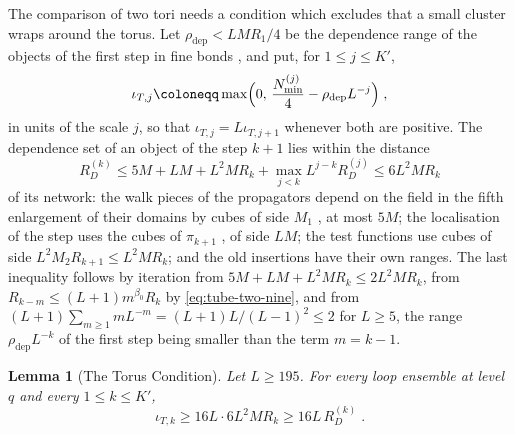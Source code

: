 \documentclass[11pt]{preprint}
\numberwithin{equation}{section}
\newtheorem{lemma}[theorem]{Lemma}
\theoremstyle{definition}
\theoremstyle{remark}
\theoremstyle{plain}
\begin{document}
The comparison of two tori needs a condition which excludes that a small cluster wraps around the torus. Let $\rho_{\mathrm{dep}} < LMR_1/4$ be the dependence range of the objects of the first step in fine bonds \cite[Sections~E.9.2 and~E.10.4]{WilsonFirstStep}, and put, for $1 \leq j \leq K'$,
\begin{equation}\label{eq:torus-margin}
    \iota_{T,j} \coloneqq \max\Bigl(0,\, \frac{N^{(j)}_{\min}}{4} - \rho_{\mathrm{dep}}L^{-j}\Bigr)\;,
\end{equation}
in units of the scale $j$, so that $\iota_{T,j} = L\iota_{T,j+1}$ whenever both are positive. The dependence set of an object of the step $k + 1$ lies within the distance
\begin{equation}\label{eq:dependence-range}
    R^{(k)}_D \leq 5M + LM + L^2MR_k + \max_{j<k}L^{j-k}R^{(j)}_D \leq 6L^2MR_k
\end{equation}
of its network: the walk pieces of the propagators depend on the field in the fifth enlargement of their domains by cubes of side $M_1$ \cite[Theorem~3.10, p.~416]{BalabanPBG}, at most $5M$; the localisation of the step uses the cubes of $\pi_{k+1}$ \cite[p.~13]{BalabanRG2}, of side $LM$; the test functions use cubes of side $L^2M_2R_{k+1} \leq L^2MR_k$; and the old insertions have their own ranges. The last inequality follows by iteration from $5M + LM + L^2MR_k \leq 2L^2MR_k$, from $R_{k-m} \leq (L + 1)m^{\beta_0}R_k$ by \eqref{eq:tube-two-nine}, and from $(L + 1)\sum_{m \geq 1}mL^{-m} = (L + 1)L/(L - 1)^2 \leq 2$ for $L \geq 5$, the range $\rho_{\mathrm{dep}}L^{-k}$ of the first step being smaller than the term $m = k - 1$.

\begin{lemma}[The Torus Condition]\label{lem:torus-condition}
Let $L \geq 195$. For every loop ensemble at level $q$ and every $1 \leq k \leq K'$,
\begin{equation}\label{eq:torus-condition}
    \iota_{T,k} \geq 16L\cdot 6L^2MR_k \geq 16L\,R^{(k)}_D\;.
\end{equation}
\end{lemma}
\end{document}
